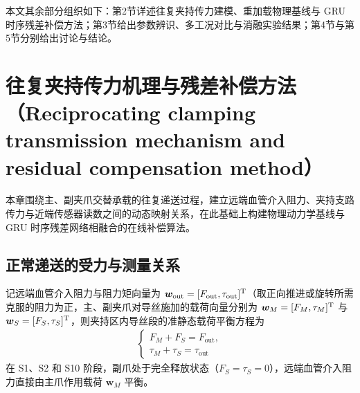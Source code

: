 \documentclass{JQRnew}
\begin{document}
本文其余部分组织如下：第2节详述往复夹持传力建模、重加载物理基线与 GRU 时序残差补偿方法；第3节给出参数辨识、多工况对比与消融实验结果；第4节与第5节分别给出讨论与结论。

\section{往复夹持传力机理与残差补偿方法（Reciprocating clamping transmission mechanism and residual compensation method）}

本章围绕主、副夹爪交替承载的往复递送过程，建立远端血管介入阻力、夹持支路传力与近端传感器读数之间的动态映射关系，在此基础上构建物理动力学基线与 GRU 时序残差网络相融合的在线补偿算法。

\subsection{正常递送的受力与测量关系}

记远端血管介入阻力与阻力矩向量为 $\bm{w}_{\text{out}} = [F_{\text{out}},\tau_{\text{out}}]^{\rm T}$（取正向推进或旋转所需克服的阻力为正，主、副夹爪对导丝施加的载荷向量分别为 $\bm{w}_{M} = [F_{M},\tau_{M}]^{\rm T}$ 与 $\bm{w}_{S} = [F_{S},\tau_{S}]^{\rm T}$，则夹持区内导丝段的准静态载荷平衡方程为
\begin{align}
	\label{eq1}
	\begin{cases}
		F_{M} + F_{S} = F_{\text{out}}, \\
		\tau_{M} + \tau_{S} = \tau_{\text{out}}
	\end{cases}
\end{align}
在 S1、S2 和 S10 阶段，副爪处于完全释放状态（$F_{S} = \tau_{S} = 0$），远端血管介入阻力直接由主爪作用载荷 $\bm{w}_{M}$ 平衡。
\end{document}
